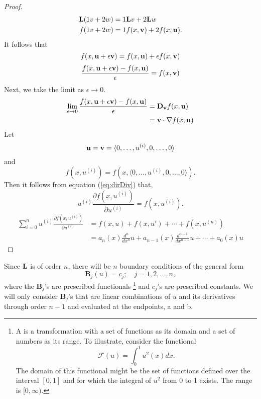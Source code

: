 \begin{proof}
\begin{equation}
\begin{split}
			\mathrm{\bf{L}}(1 v + 2 w) &= 1 \mathrm{\bf{L}} v + 2 \mathrm{\bf{L}} w\\
			f(1 v + 2 w)&= 1 f(x, \textbf{v}) + 2 f(x, \textbf{u}).
		\end{split}
	\end{equation}
	It follows that 
	\begin{equation}
		f(x, \textbf{u} + \epsilon \textbf{v}) = f(x, \textbf{u}) + \epsilon f(x, \textbf{v})
	\end{equation}
	\begin{equation}
		\frac{f(x, \textbf{u} + \epsilon \textbf{v})-f(x,\textbf{u})}{\epsilon} = f(x,\textbf{v})
	\end{equation}
	Next, we take the limit as \(\epsilon \to 0\). 
	\begin{equation}\label{eq:dirDiv}
		\begin{split}
			\lim_{\epsilon \to 0}\frac{f(x, \textbf{u} + \epsilon \textbf{v} )-f(x,\textbf{u} )}{\epsilon} &= \mathrm{\bf{D}}_{\textbf{v}} f(x,\textbf{u})\\
			&= \textbf{v} \cdot \nabla f(x,\textbf{u})
		\end{split}
	\end{equation}
	Let 
	\begin{equation}
		\textbf{u} = \textbf{v} = \langle 0, \dots, u^{(i)}, 0, \dots, 0 \rangle
	\end{equation}
	and
	\begin{equation}
		f(x,u^{(i)}) = f(x, \langle 0, \dots, u^{(i)}, 0, \dots, 0 \rangle ).
	\end{equation}
	Then it follows from equation (\ref{eq:dirDiv}) that,
	\begin{equation}
		u^{(i)}\frac{\partial f(x, u^{(i)})}{\partial u^{(i)}} = f(x,u^{(i)}).
	\end{equation}
	\begin{equation}
		\begin{split}
			\sum_{i=0}^{n} u^{(i)}\frac{\partial f(x, u^{(i)})}{\partial u^{(i)}} &= f(x,u) + f(x, u') + \cdots + f(x, u^{(n)})\\
			&= a_n(x) \frac{d^n}{dx^n}u + a_{n-1}(x) \frac{d^{n-1}}{dx^{n-1}}u + \cdots + a_0(x)u
		\end{split}
	\end{equation}
\end{proof}

	Since \(\mathrm{\bf{L}}\) is of order \(n\), there will be \(n\) boundary conditions of the general form 
\begin{equation}
	\mathbf{B}_j (u) = c_j;\quad j=1,2,\dots,n,
\end{equation}
where the \(\mathbf{B}_j\)'s are prescribed functionals \footnote{A  is a transformation with a set of functions as its domain and a set of numbers as its range. To illustrate, consider the functional 
\begin{equation}
	\mathcal{F}(u) = \int_{0}^{1} u^2(x)dx.
\end{equation}
The domain of this functional might be the set of functions defined over the interval \([0,1]\) and for which the integral of \(u^2\) from 0 to 1 exists. The range is \([0, \infty)\).
} and \(c_j\)'s are prescribed constants. We will only consider \(\mathbf{B}_j\)'s that are linear combinations of \(u\) and its derivatives through order \(n-1\) and evaluated at the endpoints, a and b. 

